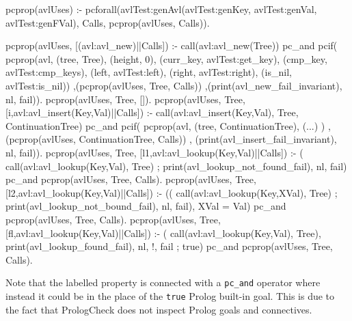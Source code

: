 \documentclass[11pt]{article}
\newcommand{\yap}[1]{\lstinline[style=yap]{#1}}
\newcommand{\Prolog}[0]{{\sf Prolog}}
\newcommand{\plqc}[0]{{\sf PrologCheck}}
\begin{document}
\begin{yapcode}
 pcprop(avlUses) :-
   pcforall(avlTest:genAvl(avlTest:genKey,
              avlTest:genVal, avlTest:genFVal),
            Calls, pcprop({avlUses, Calls})).

 pcprop({avlUses, [(avl:avl_new)||Calls]}) :-
   call(avl:avl_new(Tree))
  pc_and
   pcif(
     pcprop({avl, (tree, Tree), (height, 0),
                  (curr_key, avlTest:get_key),
                  (cmp_key, avlTest:cmp_keys),
                  (left, avlTest:left),
                  (right, avlTest:right),
                  (is_nil, avlTest:is_nil)})
   ,(pcprop({avlUses, Tree, Calls}))
   ,(print(avl_new_fail_invariant), nl, fail)).
 pcprop({avlUses, Tree, []}).
 pcprop({avlUses, Tree,
      [{i,avl:avl_insert(Key,Val)}||Calls]}) :-
   call(avl:avl_insert(Key,Val),
        Tree, ContinuationTree)
     pc_and
   pcif(
     pcprop({avl, (tree, ContinuationTree),
             (...) })
   , (pcprop({avlUses, ContinuationTree,
              Calls}))
   , (print(avl_insert_fail_invariant),
      nl, fail)).
 pcprop({avlUses, Tree,
      [{l1,avl:avl_lookup(Key,Val)}||Calls]}) :-
   ( call(avl:avl_lookup(Key,Val), Tree)
   ; print(avl_lookup_not_found_fail),
     nl, fail)
     pc_and
   pcprop({avlUses, Tree, Calls}).
 pcprop({avlUses, Tree,
      [{l2,avl:avl_lookup(Key,Val)}||Calls]}) :-
   (( call(avl:avl_lookup(Key,XVal), Tree)
    ; print(avl_lookup_not_bound_fail),
     nl, fail),
    XVal = Val)
     pc_and
   pcprop({avlUses, Tree, Calls}).
 pcprop({avlUses, Tree,
      [{fl,avl:avl_lookup(Key,Val)}||Calls]}) :-
   ( call(avl:avl_lookup(Key,Val), Tree),
     print(avl_lookup_found_fail), nl, !, fail
   ; true)
     pc_and
   pcprop({avlUses, Tree, Calls}).
\end{yapcode}
%
Note that the labelled property is connected with a \yap{pc_and} operator
where instead it could be in the place of the \yap{true} \Prolog{}
built-in goal.
%
This is due to the fact that \plqc{} does not inspect \Prolog{} goals
and connectives.
\end{document}
